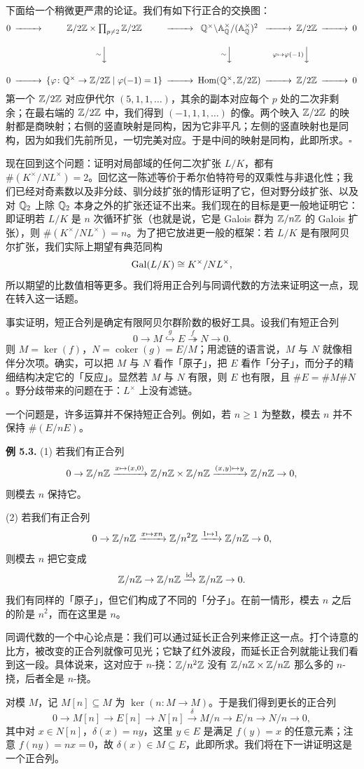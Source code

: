 下面给一个稍微更严肃的论证。我们有如下行正合的交换图：
\[
\begin{CD}
0 @>>> \Z/2\Z\times\prod_{p\neq2}\Z/2\Z @>>>
\Q^\times\backslash\mathbb{A}_\Q^\times/(\mathbb{A}_\Q^\times)^2 @>>> \Z/2\Z @>>> 0\\[2.2ex]
@. @V{\sim}VV @V{\sim}VV @V{\varphi\mapsto\varphi(-1)}VV @.\\[2.2ex]
0 @>>> \{\varphi\colon\Q^\times\to\Z/2\Z\mid\varphi(-1)=1\} @>>>
\operatorname{Hom}(\Q^\times,\Z/2\Z) @>>> \Z/2\Z @>>> 0
\end{CD}
\]
第一个 $\mathbb{Z}/2\mathbb{Z}$ 对应伊代尔 $(5,1,1,\dots)$，其余的副本对应每个 $p$ 处的二次非剩余；在最右端的 $\mathbb{Z}/2\mathbb{Z}$ 中，我们得到 $(-1,1,1,\dots)$ 的像。两个映入 $\mathbb{Z}/2\mathbb{Z}$ 的映射都是商映射；右侧的竖直映射是同构，因为它非平凡；左侧的竖直映射也是同构，因为如我们先前所见，一切完美对应。于是中间的映射是同构，此即所求。\hfill$\square$

现在回到这个问题：证明对局部域的任何二次扩张 $L/K$，都有 $\#(K^\times/NL^\times)=2$。回忆这一陈述等价于希尔伯特符号的双乘性与非退化性；我们已经对奇素数以及非分歧、驯分歧扩张的情形证明了它，但对野分歧扩张、以及对 $\mathbb{Q}_2$ 上除 $\mathbb{Q}_2$ 本身之外的扩张还证不出来。我们现在的目标是更一般地证明它：即证明若 $L/K$ 是 $n$ 次循环扩张（也就是说，它是 Galois 群为 $\mathbb{Z}/n\mathbb{Z}$ 的 Galois 扩张），则 $\#(K^\times/NL^\times)=n$。为了把它放进更一般的框架：若 $L/K$ 是有限阿贝尔扩张，我们实际上期望有典范同构
\[
\operatorname{Gal}(L/K)\cong K^\times/NL^\times,
\]
所以期望的比数值相等更多。我们将用正合列与同调代数的方法来证明这一点，现在转入这一话题。

事实证明，短正合列是确定有限阿贝尔群阶数的极好工具。设我们有短正合列
\[
0\to M\overset{g}{\hookrightarrow}E\overset{f}{\twoheadrightarrow}N\to 0.
\]
则 $M=\ker(f)$，$N=\operatorname{coker}(g)=E/M$；用滤链的语言说，$M$ 与 $N$ 就像相伴分次项。确实，可以把 $M$ 与 $N$ 看作「原子」，把 $E$ 看作「分子」，而分子的精细结构决定它的「反应」。显然若 $M$ 与 $N$ 有限，则 $E$ 也有限，且 $\#E=\#M\#N$。野分歧带来的问题在于：$L^\times$ 上没有滤链。

一个问题是，许多运算并不保持短正合列。例如，若 $n\ge1$ 为整数，模去 $n$ 并不保持 $\#(E/nE)$。

\textbf{例 5.3.} (1) 若我们有正合列
\[
0\to\mathbb{Z}/n\mathbb{Z}\xrightarrow{x\mapsto(x,0)}\mathbb{Z}/n\mathbb{Z}\times\mathbb{Z}/n\mathbb{Z}
\xrightarrow{(x,y)\mapsto y}\mathbb{Z}/n\mathbb{Z}\to 0,
\]
则模去 $n$ 保持它。

(2) 若我们有正合列
\[
0\to\mathbb{Z}/n\mathbb{Z}\xrightarrow{x\mapsto xn}\mathbb{Z}/n^2\mathbb{Z}\xrightarrow{1\mapsto1}\mathbb{Z}/n\mathbb{Z}\to 0,
\]
则模去 $n$ 把它变成
\[
\mathbb{Z}/n\mathbb{Z}\to\mathbb{Z}/n\mathbb{Z}\xrightarrow{\operatorname{id}}\mathbb{Z}/n\mathbb{Z}\to 0.
\]
我们有同样的「原子」，但它们构成了不同的「分子」。在前一情形，模去 $n$ 之后的阶是 $n^2$，而在这里是 $n$。

同调代数的一个中心论点是：我们可以通过延长正合列来修正这一点。打个诗意的比方，被改变的正合列就像可见光；它缺了红外波段，而延长正合列就能让我们看到这一段。具体说来，这对应于 $n$-挠：$\mathbb{Z}/n^2\mathbb{Z}$ 没有 $\mathbb{Z}/n\mathbb{Z}\times\mathbb{Z}/n\mathbb{Z}$ 那么多的 $n$-挠，后者全是 $n$-挠。

对模 $M$，记 $M[n]\subseteq M$ 为 $\ker(n\colon M\to M)$。于是我们得到更长的正合列
\[
0\to M[n]\to E[n]\to N[n]\xrightarrow{\ \delta\ }M/n\to E/n\to N/n\to 0,
\]
其中对 $x\in N[n]$，$\delta(x)=ny$，这里 $y\in E$ 是满足 $f(y)=x$ 的任意元素；注意 $f(ny)=nx=0$，故 $\delta(x)\in M\subseteq E$，此即所求。我们将在下一讲证明这是一个正合列。

